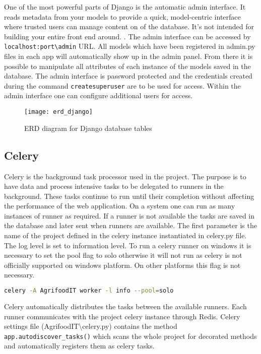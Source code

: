 One of the most powerful parts of Django is the automatic admin interface. It
reads metadata from your models to provide a quick, model-centric interface
where trusted users can manage content on of the database. It’s not intended for
building your entire front end around. \cite{django_admin}. The admin interface
can be accessed by \texttt{localhost:port\textbackslash admin} URL. All models which have
been registered in admin.py files in each app will automatically show up in the
admin panel. From there it is possible to manipulate all attributes of each
instance of the models saved in the database. The admin interface is password protected and
the credentials created during the command \texttt{createsuperuser} are to be used for access.
Within the admin interface one can configure additional users for access.

\begin{figure}[H]
	\centering
	\texttt{[image: erd\_django]}
	\caption{ERD diagram for Django database tables}
	\label{fig:erd_django}
\end{figure}

\subsection{Celery}
Celery is the background task processor used in the project. The purpose is to
have data and process intensive tasks to be delegated to runners in the
background. These tasks continue to run until their completion without affecting
the performance of the web application. On a system one can run as many
instances of runner as required. If a runner is not available the tasks are
saved in the database and later sent when runners are available. The first
parameter is the name of the project defined in the celery instance instantiated
in celery.py file. The log level is set to information level. To run a celery
runner on windows it is necessary to set the pool flag to solo otherwise it will
not run as celery is not officially supported on windows platform. On other
platforms this flag is not necessary.

\begin{lstlisting}[language={bash}]
	celery -A AgrifoodIT worker -l info --pool=solo
\end{lstlisting}

Celery automatically distributes the tasks between the available runners. Each
runner communicates with the project celery instance through Redis. Celery
settings file (AgrifoodIT\textbackslash celery.py) contains the method
\texttt{app.autodiscover\_tasks()} which scans the whole project for decorated
methods and automatically registers them as celery tasks.

